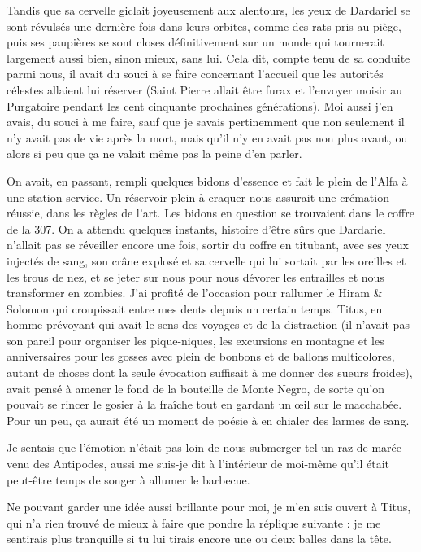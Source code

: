 Tandis que sa cervelle giclait joyeusement aux alentours, les yeux de Dardariel se sont révulsés une dernière fois dans leurs orbites, comme des rats pris au piège, puis ses paupières se sont closes définitivement sur un monde qui tournerait largement aussi bien, sinon mieux, sans lui. Cela dit, compte tenu de sa conduite parmi nous, il avait du souci à se faire concernant l’accueil que les autorités célestes allaient lui réserver (Saint Pierre allait être furax et l’envoyer moisir au Purgatoire pendant les cent cinquante prochaines générations). Moi aussi j’en avais, du souci à me faire, sauf que je savais pertinemment que non seulement il n’y avait pas de vie après la mort, mais qu’il n’y en avait pas non plus avant, ou alors si peu que ça ne valait même pas la peine d’en parler.

On avait, en passant, rempli quelques bidons d’essence et fait le plein de l’Alfa à une station-service. Un réservoir plein à craquer nous assurait une crémation réussie, dans les règles de l’art. Les bidons en question se trouvaient dans le coffre de la 307. On a attendu quelques instants, histoire d’être sûrs que Dardariel n’allait pas se réveiller encore une fois, sortir du coffre en titubant, avec ses yeux injectés de sang, son crâne explosé et sa cervelle qui lui sortait par les oreilles et les trous de nez, et se jeter sur nous pour nous dévorer les entrailles et nous transformer en zombies. J’ai profité de l’occasion pour rallumer le Hiram \& Solomon qui croupissait entre mes dents depuis un certain temps. Titus, en homme prévoyant qui avait le sens des voyages et de la distraction (il n’avait pas son pareil pour organiser les pique-niques, les excursions en montagne et les anniversaires pour les gosses avec plein de bonbons et de ballons multicolores, autant de choses dont la seule évocation suffisait à me donner des sueurs froides), avait pensé à amener le fond de la bouteille de Monte Negro, de sorte qu’on pouvait se rincer le gosier à la fraîche tout en gardant un œil sur le macchabée. Pour un peu, ça aurait été un moment de poésie à en chialer des larmes de sang.

Je sentais que l’émotion n’était pas loin de nous submerger tel un raz de marée venu des Antipodes, aussi me suis-je dit à l’intérieur de moi-même qu’il était peut-être temps de songer à allumer le barbecue.

Ne pouvant garder une idée aussi brillante pour moi, je m’en suis ouvert à Titus, qui n’a rien trouvé de mieux à faire que pondre la réplique suivante : je me sentirais plus tranquille si tu lui tirais encore une ou deux balles dans la tête.

